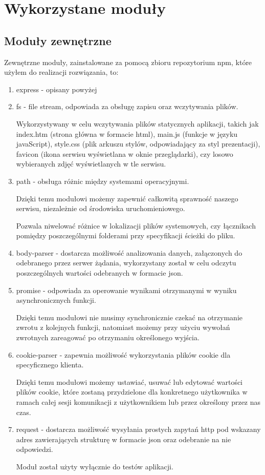\documentclass[12pt]{report}
\begin{document}
\section{Wykorzystane moduły}

\subsection{Moduły zewnętrzne}
Zewnętrzne moduły, zainstalowane za pomocą zbioru repozytorium npm, które użyłem do realizacji rozwiązania, to:
\begin{enumerate}
\item express - opisany powyżej
\item fs - file stream, odpowiada za obsługę zapisu oraz wczytywania plików.

Wykorzystywany w celu wczytywania plików statycznych aplikacji, takich jak index.htm (strona główna w formacie html), main.js (funkcje w języku javaScript), style.css (plik arkuszu stylów, odpowiadający za styl prezentacji), favicon (ikona serwisu wyświetlana w oknie przeglądarki), czy losowo wybieranych zdjęć wyświetlanych w tle serwisu.
\item path - obsługa różnic między systemami operacyjnymi.

Dzięki temu modułowi możemy zapewnić całkowitą sprawność naszego serwisu, niezależnie od środowiska uruchomieniowego.

Pozwala niwelować różnice w lokalizacji plików systemowych, czy łącznikach pomiędzy poszczególnymi folderami przy specyfikacji ścieżki do pliku.
\item body-parser - dostarcza możliwość analizowania danych, załączonych do odebranego przez serwer żądania, wykorzystany został w celu odczytu poszczególnych wartości odebranych w formacie json.
\item promise - odpowiada za operowanie wynikami otrzymanymi w wyniku asynchronicznych funkcji.

Dzięki temu modułowi nie musimy synchronicznie czekać na otrzymanie zwrotu z kolejnych funkcji, natomiast możemy przy użyciu wywołań zwrotnych zareagować po otrzymaniu określonego wyjścia.
\item cookie-parser - zapewnia możliwość wykorzystania plików cookie dla specyficznego klienta.

Dzięki temu modułowi możemy ustawiać, usuwać lub edytować wartości plików cookie, które zostaną przydzielone dla konkretnego użytkownika w ramach całej sesji komunikacji z użytkownikiem lub przez określony przez nas czas.

\item request - dostarcza możliwość wysyłania prostych zapytań http pod wskazany adres zawierających strukturę w formacie json oraz odebranie na nie odpowiedzi.

Moduł został użyty wyłącznie do testów aplikacji.
\end{enumerate}
\end{document}
